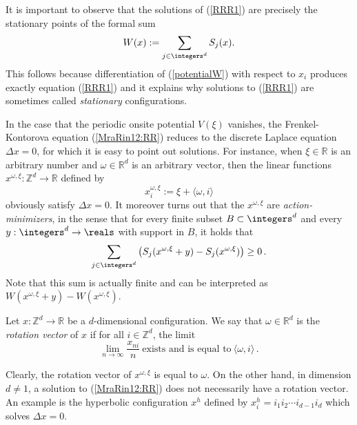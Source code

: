 \begin{description}
\indent
It is important to observe that the solutions of (\ref{RRR1}) are
precisely the stationary points of the formal sum
\begin{align}\label{potentialW}
W(x):=\sum_{j\in\integers^d} S_j(x).
\end{align}
This follows because differentiation of (\ref{potentialW}) with respect
to $x_i$ produces exactly equation (\ref{RRR1}) and it explains why
solutions to (\ref{RRR1}) are sometimes called {\it stationary}
configurations.

\noindent
In the case that the periodic onsite potential $V(\xi)$ vanishes, the
Frenkel-Kontorova equation (\ref{MraRin12:RR}) reduces to the discrete Laplace
equation $\Delta x= 0$, for which it is easy to point out solutions. For
instance, when $\xi\in \mathbb{R}$ is an arbitrary number and $\omega \in
\mathbb{R}^d$ is an arbitrary vector, then the linear functions
$x^{\omega, \xi}: \mathbb{Z}^d\to\mathbb{R}$ defined by
$$x_i^{\omega, \xi} :=\xi + \langle \omega, i\rangle $$
obviously satisfy $\Delta x = 0$. It moreover turns out that the
$x^{\omega, \xi}$ are {\it action-minimizers}, in the sense that for
every finite subset $B\subset \integers^d$ and every $y:\integers^d\to \reals$ with support
in $B$, it holds that
\[
\sum_{j\in \integers^d} \left( S_j(x^{\omega,\xi}+ y)
                        - S_j(x^{\omega, \xi}) \right) \geq 0 \,.
\]
Note that this sum is actually finite and can be interpreted as
$W(x^{\omega, \xi}+y)-W(x^{\omega,\xi})$.
\begin{definition}
Let $x:\mathbb{Z}^d\to\mathbb{R}$ be a $d$-dimensional configuration.
We say that $\omega\in \mathbb{R}^d$ is the {\it rotation vector} of $x$
if for all $i\in \mathbb{Z}^d$, the limit
\[
\lim_{n\to \infty} \frac{x_{ni}}{n} \ \mbox{exists and is equal to} \ \langle \omega, i\rangle
\,.
\]
\end{definition}
\noindent
Clearly, the rotation vector of $x^{\omega, \xi}$ is equal to $\omega$.
On the other hand, in dimension $d\neq 1$, a solution to (\ref{MraRin12:RR}) does
not necessarily have a rotation vector. An example is the hyperbolic
configuration $x^h$ defined by $x^h_i=i_1 i_2\cdots i_{d-1} i_d$ which
solves $\Delta x =0$.
\end{description}

